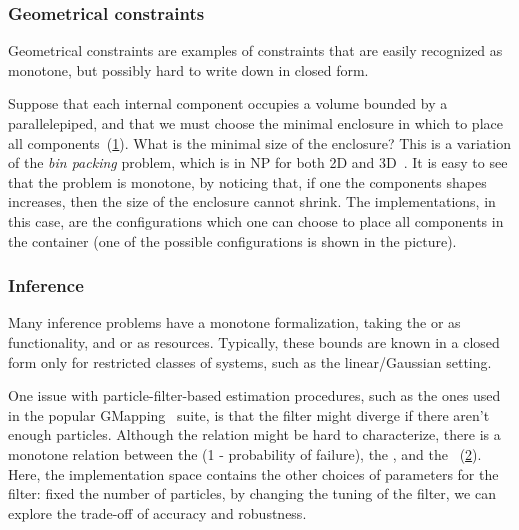 \subsubsection{Geometrical constraints}

Geometrical constraints are examples of constraints that are easily recognized as monotone, but possibly hard to write down in closed form.

\begin{example}
    Suppose that each internal component occupies a volume bounded by a parallelepiped, and that we must choose the minimal enclosure in which to place all components~(\cref{fig:packing}).
    What is the minimal size of the enclosure?
    This is a variation of the \emph{bin packing} problem, which is in NP for both 2D and 3D~\cite{lodi02two}.
    It is easy to see that the problem is monotone, by noticing that, if one the components shapes increases, then the size of the enclosure cannot shrink.
    The implementations, in this case, are the configurations which one can choose to place all components in the container (one of the possible configurations is shown in the picture).
\end{example}
\begin{figure}[tbh]
    \centering
    \caption{}
    \label{fig:packing}
\end{figure}

\subsubsection{Inference}

Many inference problems have a monotone formalization, taking the
 or  as functionality, and 
or  as resources.
Typically, these bounds are known in a closed form only for restricted classes of systems, such as the linear/Gaussian setting.

\begin{example}[SLAM]
    One issue with particle-filter-based estimation procedures, such as the ones used in the popular GMapping~\cite{grisetti07improved} suite, is that the filter might diverge if there aren't enough particles.
    Although the relation might be hard to characterize, there is a monotone relation between the  (1 - probability of failure), the , and the ~(\cref{fig:gmapping}).
    Here, the implementation space contains the other choices of parameters for the filter: fixed the number of particles, by changing the tuning of the filter, we can explore the trade-off of accuracy and robustness.
\end{example}
\begin{figure}[h!]
    \centering
    \caption{}
    \label{fig:gmapping}
\end{figure}

